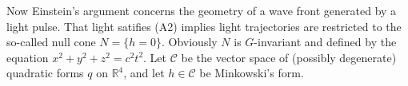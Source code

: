 \documentclass[12pt]{amsart}
\theoremstyle{definition}
\theoremstyle{remark}
\newcommand{\bR}{\mathbb{R}}
\newcommand{\sC}{\mathscr{C}}
\begin{document}
Now Einstein's argument concerns the geometry of a wave front generated by a light pulse. That light satifies (A2) implies light trajectories are restricted to the so-called null cone $N=\{h=0\}$. Obviously $N$ is $G$-invariant and defined by the equation $x^2+y^2+z^2=c^2 t^2$. Let $\sC$ be the vector space of (possibly degenerate) quadratic forms $q$ on $\bR^4$, and let $h\in \sC$ be Minkowski's form. 










\end{document}
